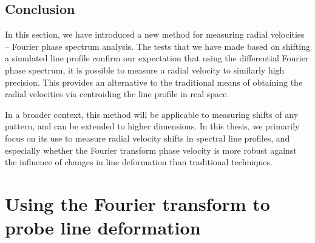 %
%


\subsection{Conclusion}
In this section, we have introduced a new method for measuring radial velocities -- Fourier phase spectrum analysis. The tests that we have made based on shifting a simulated line profile confirm our expectation that using the differential Fourier phase spectrum, it is possible to measure a radial velocity to similarly high precision. This provides an alternative to the traditional means of obtaining the radial velocities via centroiding the line profile in real space. 

In a broader context, this method will be applicable to measuring shifts of any pattern, and can be extended to higher dimensions. In this thesis, we primarily focus on its use to measure radial velocity shifts in spectral line profiles, and especially whether the Fourier transform phase velocity is more robust against the influence of changes in line deformation than traditional techniques.

\pagebreak

\section{Using the Fourier transform to probe line deformation}
\label{\thesection}
\label{sec:FT_ld}

